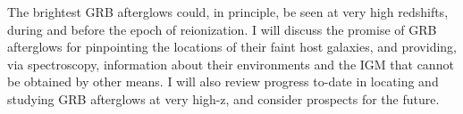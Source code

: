 


\bigskip



\bigskip

\noindent The brightest GRB afterglows could, in principle, be seen at very high redshifts, during and before the epoch of reionization.  I will discuss the promise of GRB afterglows for pinpointing the locations of their faint host galaxies, and providing, via spectroscopy, information about their environments and the IGM that cannot be obtained by other means.  I will also review progress to-date in locating and studying GRB afterglows at very high-z, and consider prospects for the future.
